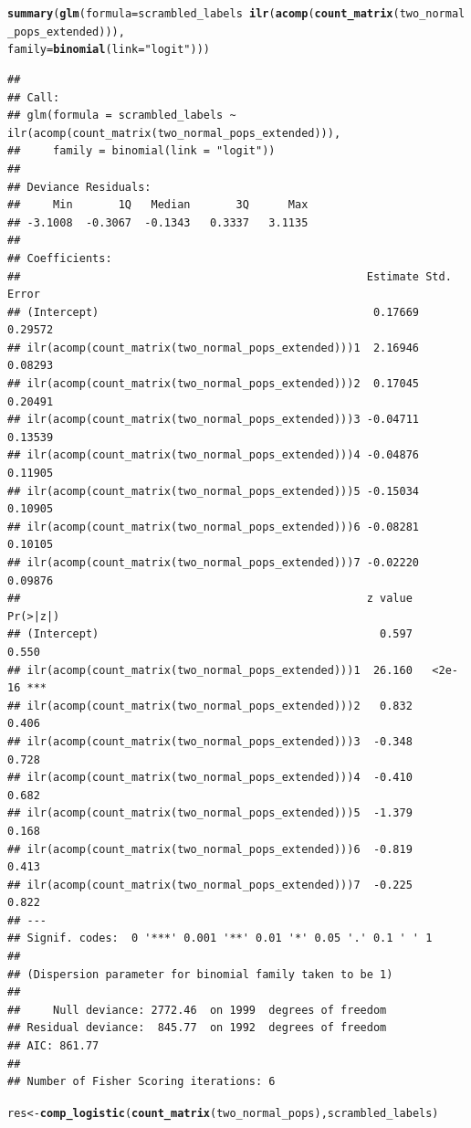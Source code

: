 \documentclass{article}\usepackage[]{graphicx}\usepackage[]{color}
\makeatletter
\newcommand{\hlstr}[1]{\textcolor[rgb]{0.192,0.494,0.8}{#1}}%
\newcommand{\hlopt}[1]{\textcolor[rgb]{0,0,0}{#1}}%
\newcommand{\hlstd}[1]{\textcolor[rgb]{0.345,0.345,0.345}{#1}}%
\newcommand{\hlkwb}[1]{\textcolor[rgb]{0.69,0.353,0.396}{#1}}%
\newcommand{\hlkwc}[1]{\textcolor[rgb]{0.333,0.667,0.333}{#1}}%
\newcommand{\hlkwd}[1]{\textcolor[rgb]{0.737,0.353,0.396}{\textbf{#1}}}%
\newenvironment{kframe}{%
 \def\at@end@of@kframe{}%
 \ifinner\ifhmode%
  \def\at@end@of@kframe{\end{minipage}}%
  \begin{minipage}{\columnwidth}%
 \fi\fi%
 \def\FrameCommand##1{\hskip\@totalleftmargin \hskip-\fboxsep
 \colorbox{shadecolor}{##1}\hskip-\fboxsep
     \hskip-\linewidth \hskip-\@totalleftmargin \hskip\columnwidth}%
 \MakeFramed {\advance\hsize-\width
   \@totalleftmargin\z@ \linewidth\hsize
   \@setminipage}}%
 {\par\unskip\endMakeFramed%
 \at@end@of@kframe}
\newenvironment{knitrout}{}{} %
\makeatother
\begin{document}
\begin{knitrout}
\begin{kframe}
\begin{alltt}
\hlkwd{summary}\hlstd{(}\hlkwd{glm}\hlstd{(}\hlkwc{formula} \hlstd{= scrambled_labels} \hlopt{~} \hlkwd{ilr}\hlstd{(}\hlkwd{acomp}\hlstd{(}\hlkwd{count_matrix}\hlstd{(two_normal_pops_extended))),}
            \hlkwc{family} \hlstd{=} \hlkwd{binomial}\hlstd{(}\hlkwc{link} \hlstd{=} \hlstr{"logit"}\hlstd{)))}
\end{alltt}
\begin{verbatim}
## 
## Call:
## glm(formula = scrambled_labels ~ ilr(acomp(count_matrix(two_normal_pops_extended))), 
##     family = binomial(link = "logit"))
## 
## Deviance Residuals: 
##     Min       1Q   Median       3Q      Max  
## -3.1008  -0.3067  -0.1343   0.3337   3.1135  
## 
## Coefficients:
##                                                     Estimate Std. Error
## (Intercept)                                          0.17669    0.29572
## ilr(acomp(count_matrix(two_normal_pops_extended)))1  2.16946    0.08293
## ilr(acomp(count_matrix(two_normal_pops_extended)))2  0.17045    0.20491
## ilr(acomp(count_matrix(two_normal_pops_extended)))3 -0.04711    0.13539
## ilr(acomp(count_matrix(two_normal_pops_extended)))4 -0.04876    0.11905
## ilr(acomp(count_matrix(two_normal_pops_extended)))5 -0.15034    0.10905
## ilr(acomp(count_matrix(two_normal_pops_extended)))6 -0.08281    0.10105
## ilr(acomp(count_matrix(two_normal_pops_extended)))7 -0.02220    0.09876
##                                                     z value Pr(>|z|)    
## (Intercept)                                           0.597    0.550    
## ilr(acomp(count_matrix(two_normal_pops_extended)))1  26.160   <2e-16 ***
## ilr(acomp(count_matrix(two_normal_pops_extended)))2   0.832    0.406    
## ilr(acomp(count_matrix(two_normal_pops_extended)))3  -0.348    0.728    
## ilr(acomp(count_matrix(two_normal_pops_extended)))4  -0.410    0.682    
## ilr(acomp(count_matrix(two_normal_pops_extended)))5  -1.379    0.168    
## ilr(acomp(count_matrix(two_normal_pops_extended)))6  -0.819    0.413    
## ilr(acomp(count_matrix(two_normal_pops_extended)))7  -0.225    0.822    
## ---
## Signif. codes:  0 '***' 0.001 '**' 0.01 '*' 0.05 '.' 0.1 ' ' 1
## 
## (Dispersion parameter for binomial family taken to be 1)
## 
##     Null deviance: 2772.46  on 1999  degrees of freedom
## Residual deviance:  845.77  on 1992  degrees of freedom
## AIC: 861.77
## 
## Number of Fisher Scoring iterations: 6
\end{verbatim}
\begin{alltt}
\hlstd{res} \hlkwb{<-} \hlkwd{comp_logistic}\hlstd{(}\hlkwd{count_matrix}\hlstd{(two_normal_pops), scrambled_labels)}
\end{alltt}



\end{kframe}
\end{knitrout}
\end{document}
